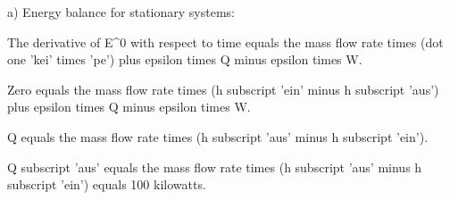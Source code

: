 a) Energy balance for stationary systems:

The derivative of E^0 with respect to time equals the mass flow rate times (dot one 'kei' times 'pe') plus epsilon times Q minus epsilon times W.

Zero equals the mass flow rate times (h subscript 'ein' minus h subscript 'aus') plus epsilon times Q minus epsilon times W.

Q equals the mass flow rate times (h subscript 'aus' minus h subscript 'ein').

Q subscript 'aus' equals the mass flow rate times (h subscript 'aus' minus h subscript 'ein') equals 100 kilowatts.